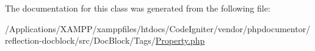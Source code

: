 The documentation for this class was generated from the following file\+:\begin{DoxyCompactItemize}
\item 
/\+Applications/\+X\+A\+M\+P\+P/xamppfiles/htdocs/\+Code\+Igniter/vendor/phpdocumentor/reflection-\/docblock/src/\+Doc\+Block/\+Tags/\mbox{\hyperlink{_property_8php}{Property.\+php}}\end{DoxyCompactItemize}
